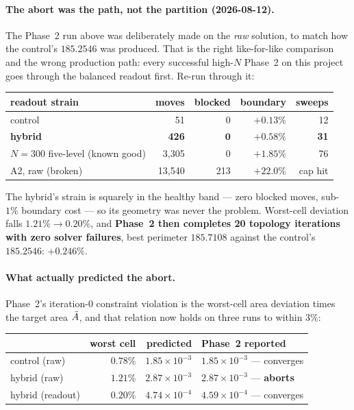 \documentclass[11pt,a4paper]{article}
\begin{document}
\paragraph{The abort was the path, not the partition (2026-08-12).} The Phase~2
run above was deliberately made on the \emph{raw} solution, to match how the
control's \(185.2546\) was produced. That is the right like-for-like comparison
and the wrong production path: every successful high-\(N\) Phase~2 on this
project goes through the balanced readout first. Re-run through it:

\begin{center}
\begin{tabular}{@{}lrrrr@{}}
\toprule
readout strain & moves & blocked & boundary & sweeps \\
\midrule
control & 51 & 0 & \(+0.13\%\) & 12 \\
\textbf{hybrid} & \textbf{426} & \(\mathbf{0}\) & \(\mathbf{+0.58\%}\) & \textbf{31} \\
\(N{=}300\) five-level (known good) & 3{,}305 & 0 & \(+1.85\%\) & 76 \\
A2, raw (broken) & 13{,}540 & 213 & \(+22.0\%\) & cap hit \\
\bottomrule
\end{tabular}
\end{center}

The hybrid's strain is squarely in the healthy band --- zero blocked moves,
sub-\(1\%\) boundary cost --- so its geometry was never the problem. Worst-cell
deviation falls \(1.21\%\to0.20\%\), and \textbf{Phase~2 then completes 20
topology iterations with zero solver failures}, best perimeter \(185.7108\)
against the control's \(185.2546\): \(+0.246\%\).

\paragraph{What actually predicted the abort.} Phase~2's iteration-0 constraint
violation is the worst-cell area deviation times the target area \(\bar{A}\), and
that relation now holds on three runs to within \(3\%\):

\begin{center}
\begin{tabular}{@{}lrrl@{}}
\toprule
 & worst cell & predicted & Phase~2 reported \\
\midrule
control (raw) & \(0.78\%\) & \(1.85\times10^{-3}\) & \(1.85\times10^{-3}\) --- converges \\
hybrid (raw) & \(1.21\%\) & \(2.87\times10^{-3}\) & \(2.87\times10^{-3}\) --- \textbf{aborts} \\
hybrid (readout) & \(0.20\%\) & \(4.74\times10^{-4}\) & \(4.59\times10^{-4}\) --- converges \\
\bottomrule
\end{tabular}
\end{center}
\end{document}
